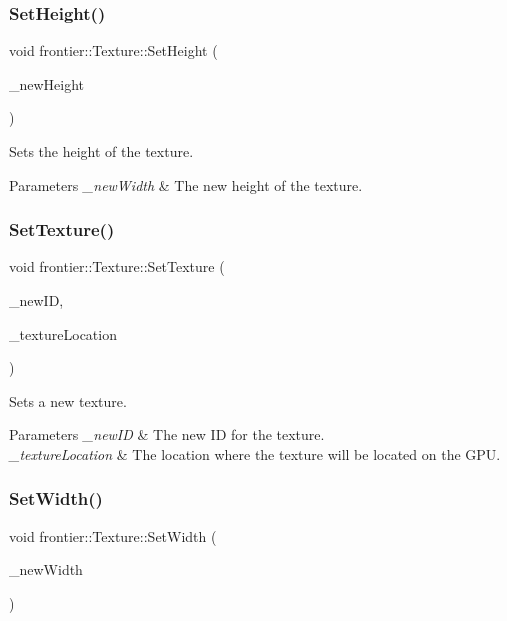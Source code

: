 \subsubsection{\texorpdfstring{Set\+Height()}{SetHeight()}}
{\footnotesize\ttfamily void frontier\+::\+Texture\+::\+Set\+Height (\begin{DoxyParamCaption}\item[{int}]{\+\_\+new\+Height }\end{DoxyParamCaption})}



Sets the height of the texture. 


\begin{DoxyParams}{Parameters}
{\em \+\_\+new\+Width} & The new height of the texture. \\
\hline
\end{DoxyParams}
\mbox{\label{classfrontier_1_1_texture_aa77328fcbb46a524cc7c8bd6b149d3cc}} 
\subsubsection{\texorpdfstring{Set\+Texture()}{SetTexture()}}
{\footnotesize\ttfamily void frontier\+::\+Texture\+::\+Set\+Texture (\begin{DoxyParamCaption}\item[{G\+Luint}]{\+\_\+new\+ID,  }\item[{int}]{\+\_\+texture\+Location }\end{DoxyParamCaption})}



Sets a new texture. 


\begin{DoxyParams}{Parameters}
{\em \+\_\+new\+ID} & The new ID for the texture. \\
\hline
{\em \+\_\+texture\+Location} & The location where the texture will be located on the G\+PU. \\
\hline
\end{DoxyParams}
\mbox{\label{classfrontier_1_1_texture_a53375bba8b0277c792c64d0246a10fd3}} 
\subsubsection{\texorpdfstring{Set\+Width()}{SetWidth()}}
{\footnotesize\ttfamily void frontier\+::\+Texture\+::\+Set\+Width (\begin{DoxyParamCaption}\item[{int}]{\+\_\+new\+Width }\end{DoxyParamCaption})}



